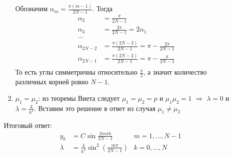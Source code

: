 \begin{task}
\begin{enumerate}
\begin{enumerate}
                  Обозначим $\alpha_m=\frac{\pi(m-1)}{2N-1}$. Тогда
                  \begin{align*}
                    \alpha_2      & = \frac{\pi}{2N-1}                                \\
                    \alpha_3      & = \frac{2\pi}{2N-1} = 2\alpha_1                   \\
                    ...           &                                                   \\
                    \alpha_{2N-2} & = \frac{\pi(2N-3)}{2N-1}= \pi - \frac{2\pi}{2N-1} \\
                    \alpha_{2N-1} & = \frac{\pi(2N-2)}{2N-1}= \pi - \frac{\pi}{2N-1}  \\
                  \end{align*}
                  То есть углы симметричны относительно $\frac{\pi}{2}$, а значит количество различных корней ровно $N-1$.

            \item $\mu_1 = \mu_2$: из теоремы Виета следует
                  $\mu_1=\mu_2=p$ и $\mu_1\mu_2 = 1$ $\Rightarrow$ $\lambda=0$ и $\lambda=\frac{4}{h^2}$.
                  Вставим это решение в ответ из случая $\mu_1\neq\mu_2$
          \end{enumerate}
          Итоговый ответ:
          \begin{align*}
            y_k     & = C\sin\frac{2m\pi k}{2N-1}                         & m=1,...,N-1 \\
            \lambda & = \frac{4}{h^2}\sin^2\left(\frac{m\pi}{2N-1}\right) & k=0,...,N
          \end{align*}
  \end{enumerate}
\end{task}
